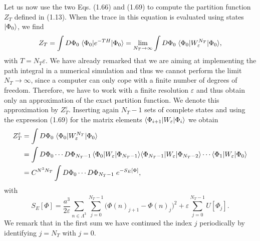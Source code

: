 Let us now use the two Eqs. (1.66) and (1.69) to compute the partition function
$Z_T$ defined in (1.13). When the trace in this equation is evaluated using
states $|\Phi_0\rangle$, we find
\begin{equation}
  Z_T = \int D\Phi_0\;\langle\Phi_0|e^{-TH}|\Phi_0\rangle
  = \lim_{N_T\to\infty}\int D\Phi_0\;\langle\Phi_0|W_\varepsilon^{N_T}|\Phi_0\rangle,
\end{equation}
with $T = N_T\varepsilon$. We have already remarked that we are aiming at
implementing the path integral in a numerical simulation and thus we cannot
perform the limit $N_T \to \infty$, since a computer can only cope with a
finite number of degrees of freedom. Therefore, we have to work with a finite
resolution $\varepsilon$ and thus obtain only an approximation of the exact
partition function. We denote this approximation by $Z_T^\varepsilon$. Inserting
again $N_T - 1$ sets of complete states and using the expression (1.69) for the
matrix elements $\langle\Phi_{i+1}|W_\varepsilon|\Phi_i\rangle$ we obtain
\begin{align}
  Z_T^\varepsilon &= \int D\Phi_0\;\langle\Phi_0|W_\varepsilon^{N_T}|\Phi_0\rangle \notag\\
  &= \int D\Phi_0\cdots D\Phi_{N_T-1}\,
     \langle\Phi_0|W_\varepsilon|\Phi_{N_T-1}\rangle
     \langle\Phi_{N_T-1}|W_\varepsilon|\Phi_{N_T-2}\rangle\cdots
     \langle\Phi_1|W_\varepsilon|\Phi_0\rangle \notag\\
  &= C^{N^3N_T}\int D\Phi_0\cdots D\Phi_{N_T-1}\;e^{-S_E[\Phi]},
\end{align}
with
\begin{equation}
  S_E[\Phi] = \frac{a^3}{2\varepsilon}\sum_{n\in\Lambda^3}
    \sum_{j=0}^{N_T-1}\big(\Phi(n)_{j+1} - \Phi(n)_j\big)^2
    + \varepsilon\sum_{j=0}^{N_T-1}U[\Phi_j].
\end{equation}
We remark that in the first sum we have continued the index $j$ periodically by
identifying $j = N_T$ with $j = 0$.

